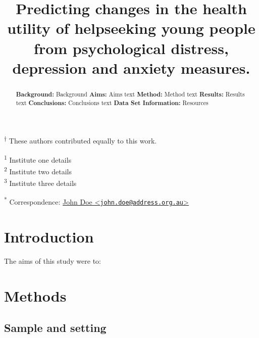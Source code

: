 \documentclass{article}
\title{Predicting changes in the health utility of helpseeking young people from psychological distress, depression and anxiety measures.}
\author{
  }
\begin{document}
\maketitle

\def\tightlist{}


\begin{abstract}
\textbf{Background: } Background \newline \newline \textbf{Aims: } Aims text \newline \newline \textbf{Method: } Method text \newline \newline \textbf{Results: } Results text \newline \newline \textbf{Conclusions: } Conclusions text \newline \newline \textbf{Data Set Information:} Resources
\end{abstract}


\textsuperscript{$\dagger{}$} These authors contributed equally to this work.

\textsuperscript{1} Institute one details\\
\textsuperscript{2} Institute two details\\
\textsuperscript{3} Institute three details

\textsuperscript{*} Correspondence: \href{mailto:john.doe@address.org.au}{John Doe \textless{}\href{mailto:john.doe@address.org.au}{\nolinkurl{john.doe@address.org.au}}\textgreater{}}

\hypertarget{introduction}{%
\section{Introduction}\label{introduction}}

The aims of this study were to:

\hypertarget{methods}{%
\section{Methods}\label{methods}}

\hypertarget{sample-and-setting}{%
\subsection{Sample and setting}\label{sample-and-setting}}
\end{document}
